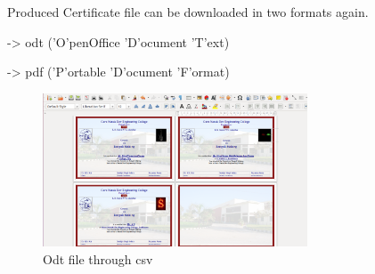 Produced Certificate file can be downloaded in two formats again.

-> odt ('O'penOffice 'D'ocument 'T'ext)

-> pdf ('P'ortable 'D'ocument 'F'ormat)
\begin{figure}[!ht]
\centering
\includegraphics[width=0.7\textwidth]{input/images/cgs/cgs14.png}                  
\caption{Odt file through csv}
\hspace{-1.5em}
\end{figure}
